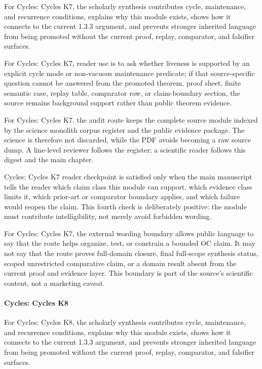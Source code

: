 For Cycles: Cycles K7, the scholarly synthesis contributes cycle, maintenance, and recurrence conditions, explains why this module exists, shows how it connects to the current 1.3.3 argument, and prevents stronger inherited language from being promoted without the current proof, replay, comparator, and falsifier surfaces.


For Cycles: Cycles K7, reader use is to ask whether liveness is supported by an explicit cycle mode or non-vacuous maintenance predicate; if that source-specific question cannot be answered from the promoted theorem, proof sheet, finite semantic case, replay table, comparator row, or claim-boundary section, the source remains background support rather than public theorem evidence.


For Cycles: Cycles K7, the audit route keeps the complete source module indexed by the science monolith corpus register and the public evidence package. The science is therefore not discarded, while the PDF avoids becoming a raw source dump. A line-level reviewer follows the register; a scientific reader follows this digest and the main chapter.


Cycles: Cycles K7 reader checkpoint is satisfied only when the main manuscript tells the reader which claim class this module can support, which evidence class limits it, which prior-art or comparator boundary applies, and which failure would reopen the claim. This fourth check is deliberately positive: the module must contribute intelligibility, not merely avoid forbidden wording.


For Cycles: Cycles K7, the external wording boundary allows public language to say that the route helps organize, test, or constrain a bounded OC claim. It may not say that the route proves full-domain closure, final full-scope synthesis status, scoped unrestricted comparative claim, or a domain result absent from the current proof and evidence layer. This boundary is part of the source's scientific content, not a marketing caveat.


\paragraph{Cycles: Cycles K8}

For Cycles: Cycles K8, the scholarly synthesis contributes cycle, maintenance, and recurrence conditions, explains why this module exists, shows how it connects to the current 1.3.3 argument, and prevents stronger inherited language from being promoted without the current proof, replay, comparator, and falsifier surfaces.



